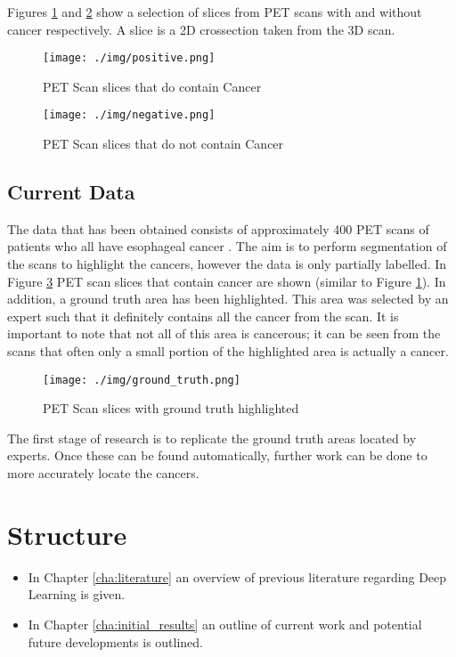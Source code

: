 Figures \ref{fig:positive} and \ref{fig:negative} show a selection of slices from PET scans with and without cancer respectively.
A slice is a 2D crossection taken from the 3D scan.

\begin{figure}[hbtp!]
    \centering
    \texttt{[image: ./img/positive.png]}
    \caption{PET Scan slices that do contain Cancer}
    \label{fig:positive}
\end{figure}

\begin{figure}[hbtp!]
    \centering
    \texttt{[image: ./img/negative.png]}
    \caption{PET Scan slices that do not contain Cancer}
    \label{fig:negative}
\end{figure}


\subsection{Current Data}\label{subsec:current_data_intro}

The data that has been obtained consists of approximately 400 PET scans of patients who all have esophageal cancer \cite{Enzinger_Mayer_2003}.
The aim is to perform segmentation of the scans to highlight the cancers, however the data is only partially labelled.
In Figure \ref{fig:ground_truth} PET scan slices that contain cancer are shown (similar to Figure \ref{fig:positive}).
In addition, a ground truth area has been highlighted.
This area was selected by an expert such that it definitely contains all the cancer from the scan.
It is important to note that not all of this area is cancerous; it can be seen from the scans that often only a small portion of the highlighted area is actually a cancer.

\begin{figure}[hbtp!]
    \centering
    \texttt{[image: ./img/ground\_truth.png]}
    \caption{PET Scan slices with ground truth highlighted}
    \label{fig:ground_truth}
\end{figure}

The first stage of research is to replicate the ground truth areas located by experts.
Once these can be found automatically, further work can be done to more accurately locate the cancers.

\section{Structure}\label{sec:structure}

\begin{itemize}
    \item In Chapter \ref{cha:literature} an overview of previous literature regarding Deep Learning is given.
    \item In Chapter \ref{cha:initial_results} an outline of current work and potential future developments is outlined.
\end{itemize}
